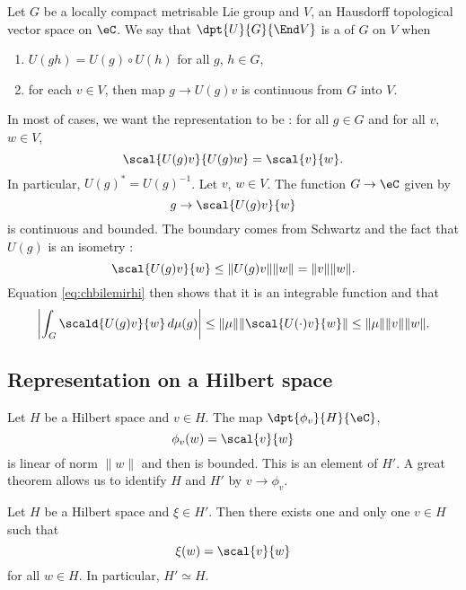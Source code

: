 Let $G$ be a locally compact metrisable Lie group and $V$, an Hausdorff topological vector space on $\eC$. We say that $\dpt{U}{G}{\End V}$ is a  of $G$ on $V$ when
\begin{enumerate}
\item $U(gh)=U(g)\circ U(h)$ for all $g$, $h\in G$,
\item for each $v\in V$, then map $g\to U(g)v$ is continuous from $G$ into $V$.
\end{enumerate}
In most of cases, we want the representation to be  : for all $g\in G$ and for all $v$, $w\in V$,
\begin{equation}
  \scal{U(g)v}{U(g)w}=\scal{v}{w}.
\end{equation}
In particular, $U(g)^*=U(g)^{-1}$. Let $v$, $w\in V$. The function $G\to\eC$ given by
\[ 
  g\to \scal{U(g)v}{w}
\]
is continuous and bounded. The boundary comes from Schwartz and the fact that $U(g)$ is an isometry :
\begin{equation}
  \scal{U(g)v}{w}\leq \| U(g)v \|\| w \|
		=\| v \|\| w \|.
\end{equation}
Equation \eqref{eq:chbilemirhi} then shows that it is an integrable function and that
\begin{equation} \label{eq:Tmuvborn}
\left|    \int_G\scald{U(g)v}{w}\,d\mu(g)   \right|\leq\| \mu \|\| \scal{U(\cdot)v}{w} \|
						\leq \| \mu \|\| v \|\| w \|.
\end{equation}

\subsection{Representation on a Hilbert space}

Let $H$ be a Hilbert space and $v\in H$. The map $\dpt{\phi_v}{H}{\eC}$,
\[ 
  \phi_v(w)=\scal{v}{w}
\]
is linear of norm $\| w \|$ and then is bounded. This is an element of $H'$. A great theorem allows us to identify $H$ and $H'$ by $v\to\phi_v$.

\begin{theorem}
   Let $H$ be a Hilbert space and $\xi\in H'$. Then there exists one and only one $v\in H$ such that 
\[ 
  \xi(w)=\scal{v}{w}
\]
for all $w\in H$. In particular, $H'\simeq H$.
\end{theorem}

